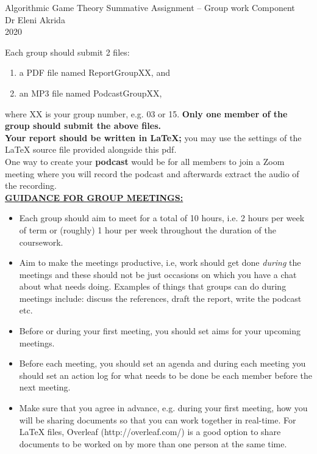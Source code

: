 \documentclass{article}
\begin{document}
\begin{center}
	\LARGE{Algorithmic Game Theory Summative Assignment -- Group work Component}\\[0.1cm]
	\Large{Dr Eleni Akrida}\\[0.1cm]
	2020\\[0.5cm]
\end{center}


\noindent Each group should submit 2 files:
	\begin{enumerate}
		\item a PDF file named ReportGroupXX, and
		\item an MP3 file named PodcastGroupXX, 
	\end{enumerate} 
where XX is your group number, e.g. 03 or 15. \textbf{Only one member of the group should submit the above files.}\\

\noindent \textbf{Your report should be written in LaTeX;} you may use the settings of the LaTeX source file provided alongside this pdf.\\
\noindent One way to create your \textbf{podcast} would be for all members to join a Zoom meeting where you will record the podcast and afterwards extract the audio of the recording.\\[0.5cm]



\textbf{\underline{GUIDANCE FOR GROUP MEETINGS:}}  

\begin{itemize}
\item Each group should aim to meet for a total of 10 hours, i.e. 2 hours per week of term or (roughly) 1 hour per week throughout the duration of the coursework. 
\item Aim to make the meetings productive, i.e, work should get done \emph{during} the meetings and these should not be just occasions on which you have a chat about what needs doing. Examples of things that groups can do during meetings include: discuss the references, draft the report, write the podcast etc.  
\item Before or during your first meeting, you should set aims for your upcoming meetings. 
\item Before each meeting, you should set an agenda and during each meeting you should set an action log for what needs to be done be each member before the next meeting.
\item Make sure that you agree in advance, e.g. during your first meeting, how you will be sharing documents so that you can work together in real-time. For LaTeX files, Overleaf (http://overleaf.com/) is a good option to share documents to be worked on by more than one person at the same time.
\end{itemize}
~\\
\end{document}
